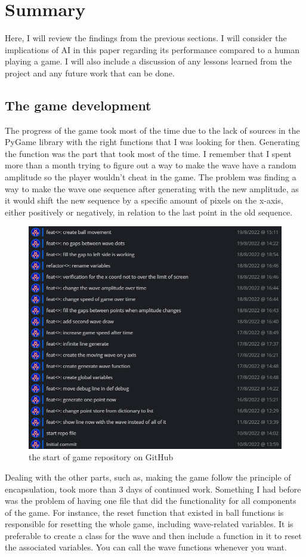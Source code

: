 \chapter{Summary}
Here, I will review the findings from the previous sections. I will consider the implications of AI in this paper regarding its performance compared to a human playing a game. I will also include a discussion of any lessons learned from the project and any future work that can be done.

\section{The game development}
The progress of the game took most of the time due to the lack of sources in the PyGame library with the right functions that I was looking for then. Generating the function was the part that took most of the time. I remember that I spent more than a month trying to figure out a way to make the wave have a random amplitude so the player wouldn't cheat in the game. The problem was finding a way to make the wave one sequence after generating with the new amplitude, as it would shift the new sequence by a specific amount of pixels on the x-axis, either positively or negatively, in relation to the last point in the old sequence.
\begin{figure}[H]
	\centering
	\includegraphics[width=0.7\linewidth]{usedImages/repoStart}
	\caption[]{the start of game repository on GitHub}
	\label{fig:repostart}
\end{figure}

Dealing with the other parts, such as, making the game follow the principle of encapsulation, took more than 3 days of continued work. Something I had before was the problem of having one file that did the functionality for all components of the game. For instance, the reset function that existed in ball functions is responsible for resetting the whole game, including wave-related variables. It is preferable to create a class for the wave and then include a function in it to reset the associated variables. You can call the wave functions whenever you want.

